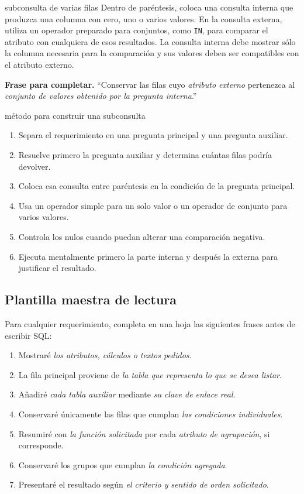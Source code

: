 \documentclass[11pt,a4paper]{article}
\newcommand{\campo}[1]{\texttt{#1}}
\begin{document}
\begin{plantilla}{subconsulta de varias filas}
Dentro de paréntesis, coloca una consulta interna que produzca una columna con cero, uno o varios
valores. En la consulta externa, utiliza un operador preparado para conjuntos, como \campo{IN}, para
comparar el atributo con cualquiera de esos resultados. La consulta interna debe mostrar sólo la
columna necesaria para la comparación y sus valores deben ser compatibles con el atributo externo.

\textbf{Frase para completar.} ``Conservar las filas cuyo \emph{atributo externo} pertenezca al
\emph{conjunto de valores obtenido por la pregunta interna}.''
\end{plantilla}

\begin{plantilla}{método para construir una subconsulta}
\begin{enumerate}[label=\arabic*.]
  \item Separa el requerimiento en una pregunta principal y una pregunta auxiliar.
  \item Resuelve primero la pregunta auxiliar y determina cuántas filas podría devolver.
  \item Coloca esa consulta entre paréntesis en la condición de la pregunta principal.
  \item Usa un operador simple para un solo valor o un operador de conjunto para varios valores.
  \item Controla los nulos cuando puedan alterar una comparación negativa.
  \item Ejecuta mentalmente primero la parte interna y después la externa para justificar el
  resultado.
\end{enumerate}
\end{plantilla}

\subsection{Plantilla maestra de lectura}

Para cualquier requerimiento, completa en una hoja las siguientes frases antes de escribir SQL:

\begin{enumerate}[label=\textbf{\arabic*.}]
  \item Mostraré \emph{los atributos, cálculos o textos pedidos}.
  \item La fila principal proviene de \emph{la tabla que representa lo que se desea listar}.
  \item Añadiré \emph{cada tabla auxiliar} mediante \emph{su clave de enlace real}.
  \item Conservaré únicamente las filas que cumplan \emph{las condiciones individuales}.
  \item Resumiré con \emph{la función solicitada} por cada \emph{atributo de agrupación}, si
  corresponde.
  \item Conservaré los grupos que cumplan \emph{la condición agregada}.
  \item Presentaré el resultado según \emph{el criterio y sentido de orden solicitado}.
\end{enumerate}
\end{document}
